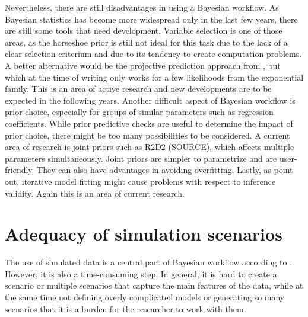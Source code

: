 Nevertheless, there are still disadvantages in using a Bayesian workflow.
As Bayesian statistics has become more widespread only in the last few years, there are still some tools that need development.
Variable selection is one of those areas, as the horseshoe prior is still not ideal for this task due to the lack of a clear selection criterium and due to its tendency to create computation problems.
A better alternative would be the projective prediction approach from \cite{piironen_projective_2020}, but which at the time of writing only works for a few likelihoods from the exponential family.
This is an area of active research and new developments are to be expected in the following years.
Another difficult aspect of Bayesian workflow is prior choice, especially for groups of similar parameters such as regression coefficients.
While prior predictive checks are useful to determine the impact of prior choice, there might be too many possibilities to be considered.
A current area of research is joint priors such as R2D2 (SOURCE), which affects multiple parameters simultaneously.
Joint priors are simpler to parametrize and are user-friendly.
They can also have advantages in avoiding overfitting.
Lastly, as \cite{gelman_bayesian_2020} point out, iterative model fitting might cause problems with respect to inference validity.
Again this is an area of current research.

\section{Adequacy of simulation scenarios}
\label{ch:adequacy_simulations}

The use of simulated data is a central part of Bayesian workflow according to \cite{gelman_bayesian_2020}.
However, it is also a time-consuming step.
In general, it is hard to create a scenario or multiple scenarios that capture the main features of the data, while at the same time not defining overly complicated models or generating so many scenarios that it is a burden for the researcher to work with them.

